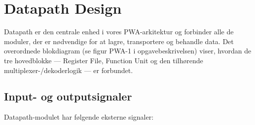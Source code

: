 \documentclass{article}
\begin{document}
\fi

\section{Datapath Design}
\label{sec:datapath-design}

Datapath er den centrale enhed i vores PWA-arkitektur og forbinder alle de moduler, der er nødvendige for at lagre, transportere og behandle data. Det overordnede blokdiagram (se figur PWA-1 i opgavebeskrivelsen) viser, hvordan de tre hovedblokke --- Register File, Function Unit og den tilhørende multiplexer-/dekoderlogik --- er forbundet.

\subsection{Input- og outputsignaler}
\label{sec:io-signals}

Datapath-modulet har følgende eksterne signaler:
\end{document}
